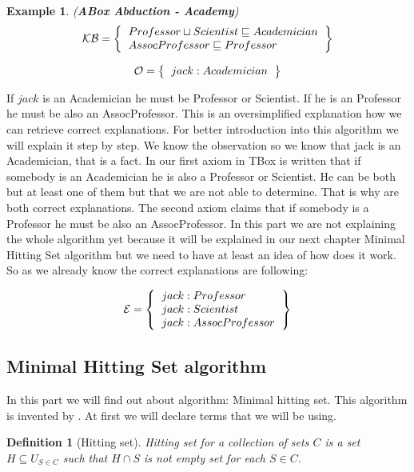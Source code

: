 \documentclass[12pt,a4paper]{article}
\newtheorem{definition}{Definition}[subsection]
\newtheorem{example}{Example}[subsection]
\begin{document}
\begin{example}{(\textbf{ABox Abduction - Academy})}
	\[ 
	\mathcal{KB} = \left\{
	\begin{tabular}{l c}
		$Professor \sqcup Scientist \sqsubseteq Academician$ \\
		$AssocProfessor \sqsubseteq Professor$ \\
	\end{tabular}
	\right \}
	\]
	
	\[ 
	\mathcal{O} = \left\{
	\begin{tabular}{l c}
		$jack : Academician$
	\end{tabular}
	\right \}
	\]								
	
\end{example}

If $jack$ is an Academician he must be Professor or Scientist. If he is an Professor he must be also an AssocProfessor. This is an oversimplified explanation how we can retrieve correct explanations. For better introduction into this algorithm we will explain it step by step. We know the observation so we know that jack is an Academician, that is a fact. In our first axiom in TBox is written that if somebody is an Academician he is also a Professor or Scientist. He can be both but at least one of them but that we are not able to determine. That is why are both correct explanations. The second axiom claims that if somebody is a Professor he must be also an AssocProfessor. In this part we are not explaining the whole algorithm yet because it will be explained in our next chapter Minimal Hitting Set algorithm but we need to have at least an idea of how does it work. So as we already know the correct explanations are following:

\[ 
\mathcal{E} = \left\{
\begin{tabular}{l c}
	$jack : Professor$ \\
	$jack : Scientist$ \\
	$jack : AssocProfessor$ \\
\end{tabular}
\right \}
\]

\subsection{Minimal Hitting Set algorithm}
In this part we will find out about algorithm: Minimal hitting set. This algorithm is invented by \citep{reiterHS}. At first we will declare terms that we will be using.

\begin{definition}[Hitting set]
	Hitting set for a collection of sets $C$ is a set $H \subseteq U_{S \in C}$ such that $H \cap S$ is not empty set for each $S \in C$.
\end{definition}
\end{document}
